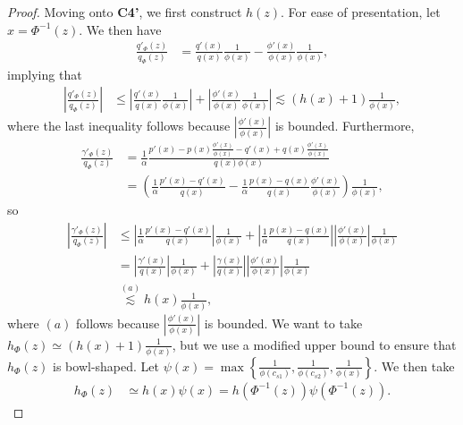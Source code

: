 \documentclass{article}
\begin{document}
\begin{proof}
Moving onto \textbf{C4'}, we first construct $h(z)$. For ease of presentation, let $x = \Phi^{-1}(z)$. We then have
\begin{align*}
\frac{q'_\Phi(z)}{q_\Phi(z)} &= \frac{ q'(x) }{q(x)} \frac{1}{ \phi(x)} - 
                     \frac{ \phi'(x) }{\phi(x)} \frac{1}{ \phi(x)},
\end{align*}
implying that
\begin{align*}
\left| \frac{q'_\Phi(z)}{q_\Phi(z)} \right| &\leq 
      \left| \frac{ q'(x) }{q(x)} \frac{1}{ \phi(x)} \right| +  
     \left| \frac{ \phi'(x) }{\phi(x)} \frac{1}{ \phi(x)} \right| \lesssim (h(x) + 1) \frac{1}{\phi(x)} ,
\end{align*}
where the last inequality follows because $\left| \frac{\phi'(x)}{\phi(x)} \right|$ is bounded. Furthermore,
\begin{align*}
 \frac{\gamma'_\Phi(z)}{q_\Phi(z)} &=   
       \frac{1}{\alpha} 
    \frac{p'(x) - p(x) \frac{\phi'(x)}{\phi(x)} - q'(x) + q(x) \frac{\phi'(x)}{\phi(x)} }
                                       {q(x) \phi(x) } \nonumber \\
  &=  \left( \frac{1}{\alpha} \frac{p'(x) - q'(x)}{q(x)} 
          - \frac{1}{\alpha} \frac{p(x) - q(x)}{q(x)} \frac{\phi'(x)}{\phi(x)}\right)
         \frac{1}{\phi(x)},
\end{align*}
so
\begin{align*}   
\left|  \frac{\gamma'_\Phi(z)}{q_\Phi(z)} \right| &\leq
      \left| \frac{1}{\alpha} \frac{p'(x) - q'(x)}{q(x)} \right| 
            \frac{1}{\phi(x)} 
          + \left| \frac{1}{\alpha} \frac{p(x) - q(x)}{q(x)} \right| 
        \left| \frac{\phi'(x)}{\phi(x)}\right|   
         \frac{1}{\phi(x)} \\
  & = \left| \frac{\gamma'(x)}{q(x)} \right| \frac{1}{\phi(x)} + 
       \left| \frac{\gamma(x)}{q(x)} \right| \left| \frac{\phi'(x)}{\phi(x)} \right| \frac{1}{\phi(x)}\\
  &\stackrel{(a)} \lesssim h(x) \frac{1}{ \phi(x)},
\end{align*}
where $(a)$ follows because $\left| \frac{\phi'(x)}{\phi(x)} \right|$ is bounded. We want to take $h_{\Phi}(z) \simeq (h(x) + 1) \frac{1}{\phi(x)}$, but we use a modified upper bound to ensure that $h_{\Phi}(z)$ is bowl-shaped. Let $\psi(x) = \max \left\{ \frac{1}{\phi(c_{s1})}, \frac{1}{\phi(c_{s2})}, \frac{1}{\phi(x)} \right\} $. We then take 
\begin{align*}
h_{\Phi}(z) &\simeq h(x) \psi(x) = h( \Phi^{-1}(z)) \psi(\Phi^{-1}(z)).
\end{align*}


\end{proof}
\end{document}
